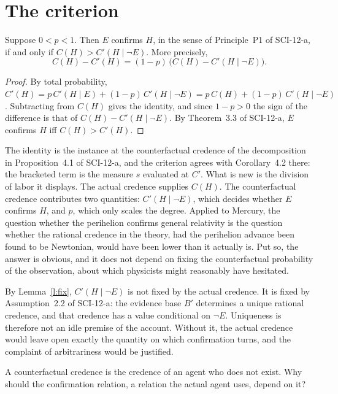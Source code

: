 \documentclass{situationist-preprint}
\begin{document}
\section{The criterion}

\begin{proposition}\label{p:crit}
Suppose $0<p<1$. Then $E$ confirms $H$, in the sense of Principle~P1 of SCI-12-a, if and only if $C(H)>C'(H\mid\neg E)$. More precisely,
\[
C(H)-C'(H)=(1-p)\,\bigl(C(H)-C'(H\mid\neg E)\bigr).
\]
\end{proposition}

\begin{proof}
By total probability, $C'(H)=p\,C'(H\mid E)+(1-p)\,C'(H\mid\neg E)=p\,C(H)+(1-p)\,C'(H\mid\neg E)$. Subtracting from $C(H)$ gives the identity, and since $1-p>0$ the sign of the difference is that of $C(H)-C'(H\mid\neg E)$. By Theorem~3.3 of SCI-12-a, $E$ confirms $H$ iff $C(H)>C'(H)$.
\end{proof}

The identity is the instance at the counterfactual credence of the decomposition in Proposition~4.1 of SCI-12-a, and the criterion agrees with Corollary~4.2 there: the bracketed term is the measure $s$ evaluated at $C'$. What is new is the division of labor it displays. The actual credence supplies $C(H)$. The counterfactual credence contributes two quantities: $C'(H\mid\neg E)$, which decides whether $E$ confirms $H$, and $p$, which only scales the degree. Applied to Mercury, the question whether the perihelion confirms general relativity is the question whether the rational credence in the theory, had the perihelion advance been found to be Newtonian, would have been lower than it actually is. Put so, the answer is obvious, and it does not depend on fixing the counterfactual probability of the observation, about which physicists might reasonably have hesitated.

By Lemma~\ref{l:fix}, $C'(H\mid\neg E)$ is not fixed by the actual credence. It is fixed by Assumption~2.2 of SCI-12-a: the evidence base $B'$ determines a unique rational credence, and that credence has a value conditional on $\neg E$. Uniqueness is therefore not an idle premise of the account. Without it, the actual credence would leave open exactly the quantity on which confirmation turns, and the complaint of arbitrariness would be justified.

\begin{objection}
A counterfactual credence is the credence of an agent who does not exist. Why should the confirmation relation, a relation the actual agent uses, depend on it?
\end{objection}
\end{document}
